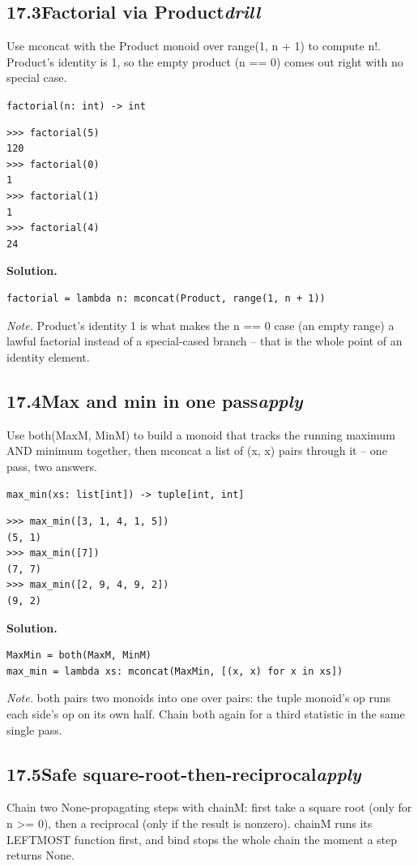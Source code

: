 \documentclass[10pt,letterpaper]{book}
\begin{document}
\subsection*{17.3\quad Factorial via Product\hfill\textnormal{\textit{drill}}}
Use mconcat with the Product monoid over range(1, n + 1) to compute n!. Product's identity is 1, so the empty product (n == 0) comes out right with no special case.

\noindent\texttt{factorial(n: int) -> int}
\begin{lstlisting}[style=ex]
>>> factorial(5)
120
>>> factorial(0)
1
>>> factorial(1)
1
>>> factorial(4)
24
\end{lstlisting}
\noindent\textbf{Solution.}
\begin{lstlisting}[style=code]
factorial = lambda n: mconcat(Product, range(1, n + 1))
\end{lstlisting}
\noindent\textit{Note.} Product's identity 1 is what makes the n == 0 case (an empty range) a lawful factorial instead of a special-cased branch -- that is the whole point of an identity element.

\subsection*{17.4\quad Max and min in one pass\hfill\textnormal{\textit{apply}}}
Use both(MaxM, MinM) to build a monoid that tracks the running maximum AND minimum together, then mconcat a list of (x, x) pairs through it -- one pass, two answers.

\noindent\texttt{max\_min(xs: list[int]) -> tuple[int, int]}
\begin{lstlisting}[style=ex]
>>> max_min([3, 1, 4, 1, 5])
(5, 1)
>>> max_min([7])
(7, 7)
>>> max_min([2, 9, 4, 9, 2])
(9, 2)
\end{lstlisting}
\noindent\textbf{Solution.}
\begin{lstlisting}[style=code]
MaxMin = both(MaxM, MinM)
max_min = lambda xs: mconcat(MaxMin, [(x, x) for x in xs])
\end{lstlisting}
\noindent\textit{Note.} both pairs two monoids into one over pairs: the tuple monoid's op runs each side's op on its own half. Chain both again for a third statistic in the same single pass.

\subsection*{17.5\quad Safe square-root-then-reciprocal\hfill\textnormal{\textit{apply}}}
Chain two None-propagating steps with chainM: first take a square root (only for n >= 0), then a reciprocal (only if the result is nonzero). chainM runs its LEFTMOST function first, and bind stops the whole chain the moment a step returns None.
\end{document}
